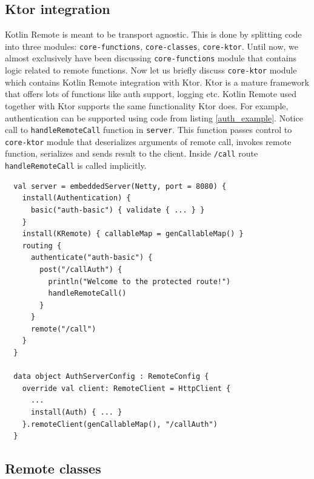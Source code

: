\documentclass[a4paper,11pt,oneside]{article}
\newcommand{\kotlini}[1]{\texttt{#1}}
\newcommand{\ki}[1]{\kotlini{#1}}
\begin{document}
\subsection{Ktor integration}
Kotlin Remote is meant to be transport agnostic. This is done by splitting code into three modules:
\kotlini{core-functions}, \ki{core-classes}, \ki{core-ktor}. Until now, we almost exclusively have
been discussing \ki{core-functions} module that contains logic related to remote functions. Now let us
briefly discuss \ki{core-ktor} module which contains Kotlin Remote integration with Ktor. Ktor is a
mature framework that offers lots of functions like auth support, logging etc. Kotlin Remote used
together with Ktor supports the same functionality Ktor does. For example, authentication can be
supported using code from listing \ref{auth_example}. Notice call to \ki{handleRemoteCall} function
in \ki{server}. This function passes control to \ki{core-ktor} module that deserializes arguments
of remote call, invokes remote function, serializes and sends result to the client. Inside
\ki{/call} route \ki{handleRemoteCall} is called implicitly.

\begin{listing}[!h]
  \begin{verbatim}
  val server = embeddedServer(Netty, port = 8080) {
    install(Authentication) {
      basic("auth-basic") { validate { ... } }
    }
    install(KRemote) { callableMap = genCallableMap() }
    routing {
      authenticate("auth-basic") {
        post("/callAuth") {
          println("Welcome to the protected route!")
          handleRemoteCall()
        }
      }
      remote("/call")
    }
  }

  data object AuthServerConfig : RemoteConfig {
    override val client: RemoteClient = HttpClient {
      ...
      install(Auth) { ... }
    }.remoteClient(genCallableMap(), "/callAuth")
  }
  \end{verbatim}
  \caption{Authentication support}\label{auth_example}
\end{listing}

\subsection{Remote classes}
\end{document}
